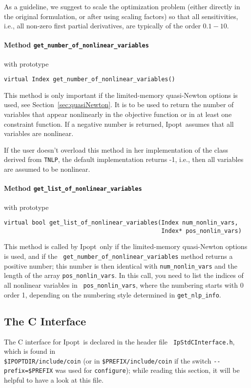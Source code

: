 \documentclass[10pt]{article}
\newcommand{\Ipopt}{{\sc Ipopt}}
\begin{document}
As a guideline, we suggest to scale the optimization problem (either
directly in the original formulation, or after using scaling factors)
so that all sensitivities, i.e., all non-zero first partial
derivatives, are typically of the order $0.1-10$.

\paragraph{Method \texttt{get\_number\_of\_nonlinear\_variables}} with prototype
\begin{verbatim}
virtual Index get_number_of_nonlinear_variables()
\end{verbatim}

This method is only important if the limited-memory quasi-Newton
options is used, see Section~\ref{sec:quasiNewton}.  It is to be used
to return the number of variables that appear nonlinearly in the
objective function or in at least one constraint function.  If a
negative number is returned, \Ipopt\ assumes that all variables are
nonlinear.

If the user doesn't overload this method in her implementation of the
class derived from {\tt TNLP}, the default implementation returns -1,
i.e., then all variables are assumed to be nonlinear.

\paragraph{Method \texttt{get\_list\_of\_nonlinear\_variables}} with prototype
\begin{verbatim}
virtual bool get_list_of_nonlinear_variables(Index num_nonlin_vars,
                                             Index* pos_nonlin_vars)
\end{verbatim}

This method is called by \Ipopt\ only if the limited-memory
quasi-Newton options is used, and if the {\tt
  get\_number\_of\_nonlinear\_variables} method returns a positive
number; this number is then identical with {\tt num\_nonlin\_vars} and
the length of the array {\tt pos\_nonlin\_vars}.  In this call, you
need to list the indices of all nonlinear variables in {\tt
  pos\_nonlin\_vars}, where the numbering starts with 0 order 1,
depending on the numbering style determined in {\tt get\_nlp\_info}.


\subsection{The C Interface}\label{sec.cinterface}
The C interface for \Ipopt\ is declared in the header file {\tt
  IpStdCInterface.h}, which is found in\\
\texttt{\$IPOPTDIR/include/coin} (or in
\texttt{\$PREFIX/include/coin} if the switch
\verb|--prefix=$PREFIX| was used for {\tt configure}); while
reading this section, it will be helpful to have a look at this file.
\end{document}
